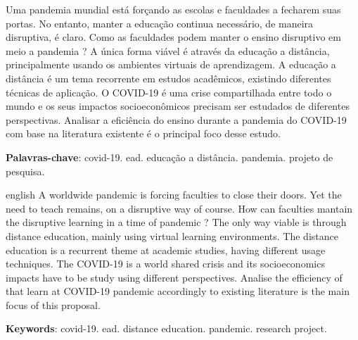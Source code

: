 \documentclass[
	arial,
	12pt,				%
	openright,			%
	oneside,
	a4paper,			%
	chapter=TITLE,		%
	english,			%
	french,				%
	spanish,			%
	brazil,				%
	]{abntex2}
\begin{document}

\frenchspacing 


\imprimircapa

\imprimirfolhaderosto


\begin{resumo}
Uma pandemia mundial está forçando as escolas e faculdades a fecharem suas portas. No entanto, manter a educação continua necessário, de maneira disruptiva, é claro. Como as faculdades podem manter o ensino disruptivo em meio a pandemia ? A única forma viável é através da educação a distância, principalmente usando os ambientes virtuais de aprendizagem. A educação a distância é um tema recorrente em estudos acadêmicos, existindo diferentes técnicas de aplicação. O COVID-19 é uma crise compartilhada entre todo o mundo e os seus impactos socioeconômicos precisam ser estudados de diferentes perspectivas. Analisar a eficiência do ensino durante a pandemia do COVID-19 com base na literatura existente é o principal foco desse estudo.
\vspace{\onelineskip}

\noindent
\textbf{Palavras-chave}: covid-19. ead. educação a distância. pandemia. projeto de pesquisa. 
\end{resumo}
\begin{resumo}[Abstract]
\begin{otherlanguage*}{english}
A worldwide pandemic is forcing faculties to close their doors. Yet the need to teach remains, on a disruptive way of course. How can faculties mantain the disruptive learning in a time of pandemic ? The only way viable is through distance education, mainly using virtual learning environments. The distance education is a recurrent theme at academic studies, having different usage techniques. The COVID-19 is a world shared crisis and its socioeconomics impacts have to be study using different perspectives. Analise the efficiency of that learn at COVID-19 pandemic accordingly to existing literature is the main focus of this proposal.
\vspace{\onelineskip}

\noindent
\textbf{Keywords}:  covid-19. ead. distance education. pandemic. research project. 
\end{otherlanguage*}
\end{resumo}
\end{document}
